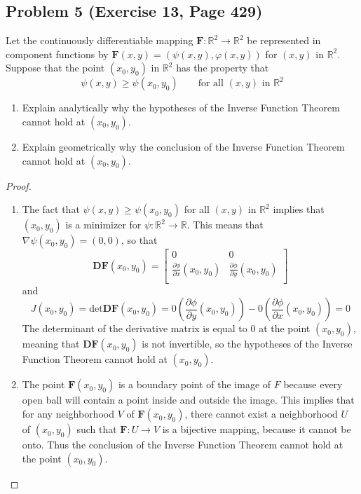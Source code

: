 \documentclass{article}
\begin{document}
\subsection*{Problem 5 (Exercise 13, Page 429)}
Let the continuously differentiable mapping $\textbf{F} \colon \mathbb{R}^2 \to \mathbb{R}^2$ be represented in component functions by $\textbf{F}(x, y) = (\psi(x, y), \varphi(x, y))$ for $(x, y)$ in $\mathbb{R}^2$. Suppose that the point $(x_0, y_0)$ in $\mathbb{R}^2$ has the property that
\[ \psi(x, y) \geq \psi(x_0, y_0) \qquad \text{for all $(x, y)$ in $\mathbb{R}^2$}\]
\begin{enumerate}[label = \alph*.]
    \item Explain analytically why the hypotheses of the Inverse Function Theorem cannot hold at $(x_0, y_0)$.
    \item Explain geometrically why the conclusion of the Inverse Function Theorem cannot hold at $(x_0, y_0)$.
\end{enumerate}
\begin{proof}
\qquad
\begin{enumerate}[label = \alph*.]
    \item The fact that $\psi(x, y) \geq \psi(x_0, y_0)$ for all $(x, y)$ in $\mathbb{R}^2$ implies that $(x_0, y_0)$ is a minimizer for $\psi \colon \mathbb{R}^2 \to \mathbb{R}$. This means that $\nabla \psi(x_0, y_0) = (0, 0)$, so that 
    \[ \textbf{DF}(x_0, y_0) = \begin{bmatrix}
    0 & 0 \\
    \frac{\partial \phi}{\partial x}(x_0, y_0) & \frac{\partial \phi}{\partial y}(x_0, y_0) \\ 
    \end{bmatrix}\]
    and
    \[J(x_0, y_0) = \text{det}\textbf{DF}(x_0, y_0) = 0(\frac{\partial \phi}{\partial y}(x_0, y_0)) - 0(\frac{\partial \phi}{\partial x}(x_0, y_0)) = 0\]
    The determinant of the derivative matrix is equal to 0 at the point $(x_0, y_0)$, meaning that $\textbf{DF}(x_0, y_0)$ is not invertible, so the hypotheses of the Inverse Function Theorem cannot hold at $(x_0, y_0)$.
    \item The point $\textbf{F}(x_0, y_0)$ is a boundary point of the image of $F$ because every open ball will contain a point inside and outside the image. This implies that for any neighborhood $V$ of $\textbf{F}(x_0, y_0)$, there cannot exist a neighborhood $U$ of $(x_0, y_0)$ such that $\textbf{F} \colon U \to V$ is a bijective mapping, because it cannot be onto. Thus the conclusion of the Inverse Function Theorem cannot hold at the point $(x_0, y_0)$. 
\end{enumerate}
\end{proof}
\end{document}
